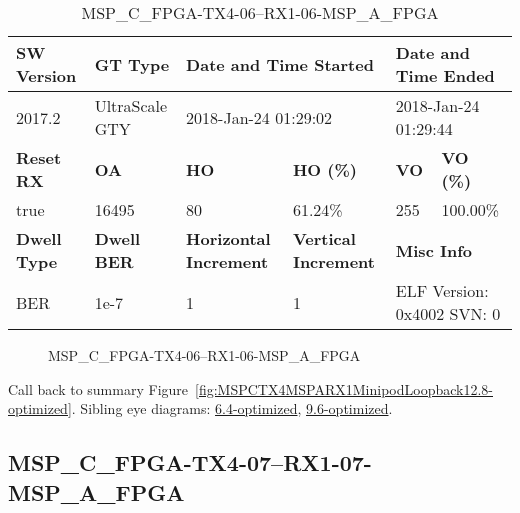 \begin{table}[h]
\centering
\caption{MSP\_C\_FPGA-TX4-06--RX1-06-MSP\_A\_FPGA}
\label{tab:MSPCFPGATX406RX106MSPAFPGA12.8-optimized}
\begin{tabular}{@{}|l|l|l|l|l|l|@{}}
\toprule
\textbf{SW Version}                & \textbf{GT Type}   & \multicolumn{2}{l|}{\textbf{Date and Time Started}}            & \multicolumn{2}{l|}{\textbf{Date and Time Ended}}        \\ \midrule
2017.2                       & UltraScale GTY          & \multicolumn{2}{l|}{2018-Jan-24 01:29:02}                   & \multicolumn{2}{l|}{2018-Jan-24 01:29:44}               \\ \midrule
\textbf{Reset RX}                  & \textbf{OA} & \textbf{HO}   & \textbf{HO (\%)} & \textbf{VO} & \textbf{VO (\%)} \\ \midrule
true & 16495        & 80          & 61.24\%        & 255        & 100.00\%       \\ \midrule
\textbf{Dwell Type}                & \textbf{Dwell BER} & \textbf{Horizontal Increment} & \textbf{Vertical Increment}    & \multicolumn{2}{l|}{\textbf{Misc Info}}                  \\ \midrule
BER                            & 1e-7        & 1        & 1           & \multicolumn{2}{l|}{ELF Version: 0x4002 SVN: 0}                         \\ \bottomrule
\end{tabular}
\end{table}

\begin{figure}[h]
\caption{MSP\_C\_FPGA-TX4-06--RX1-06-MSP\_A\_FPGA} \label{fig:MSPCFPGATX406RX106MSPAFPGA12.8-optimized}
\end{figure}

Call back to summary Figure~\ref{fig:MSPCTX4MSPARX1MinipodLoopback12.8-optimized}.
Sibling eye diagrams: \hyperref[sec:MSPCFPGATX406RX106MSPAFPGA6.4-optimized]{6.4-optimized}, \hyperref[sec:MSPCFPGATX406RX106MSPAFPGA9.6-optimized]{9.6-optimized}.

\clearpage
\newpage


\subsection{MSP\_C\_FPGA-TX4-07--RX1-07-MSP\_A\_FPGA}\label{sec:MSPCFPGATX407RX107MSPAFPGA12.8-optimized}

